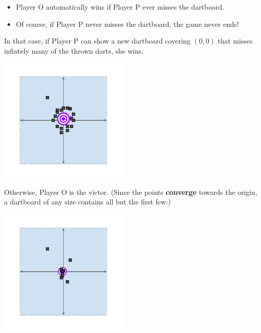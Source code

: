 \documentclass{beamer}
\begin{document}
\begin{frame}
  \begin{itemize}
    \item
      Player O automatically wins if Player P ever misses the dartboard.
    \pause
    \item
      Of course, if Player P never misses the dartboard, the game never ends! 
  \end{itemize}
\end{frame}
\begin{frame}
      In that case, if Player P can show a new dartboard covering $(0,0)$ that misses infintely many of the thrown darts, she wins. 
  \begin{center}
    \includegraphics[height=6cm]{images/topdarts_plane_pwins}
  \end{center}
\end{frame}
\begin{frame}
  Otherwise, Player O is the victor. (Since the points \textbf{converge} towards the origin, a dartboard of any size contains all but the first few:)
  \begin{center}
    \includegraphics[height=6cm]{images/topdarts_plane_owins}
  \end{center}
\end{frame}
\end{document}
